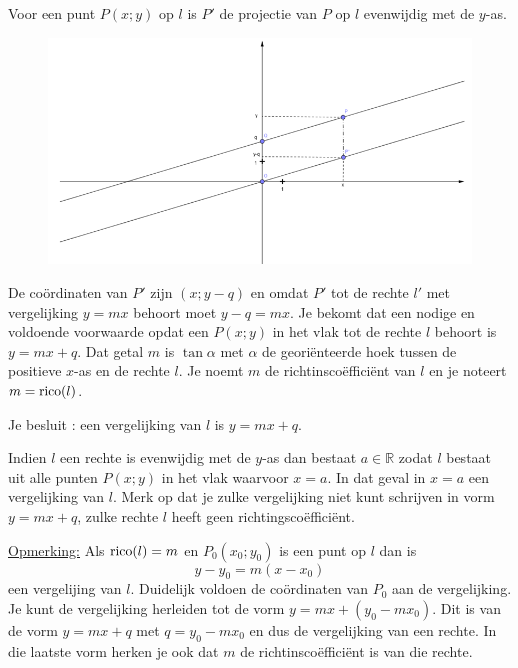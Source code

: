 Voor een punt $P(x;y)$ op $l$ is $P'$ de projectie van $P$ op $l$ evenwijdig met de $y$-as.
\begin{figure}[!htb]
\begin{center}
\includegraphics[height=8 cm]{4_opp_inhoud_an_meetk/inputs/AMtekst4Fig3}
\end{center}
\end{figure} 
De co\"ordinaten van $P'$ zijn $(x;y-q)$ en omdat $P'$ tot de rechte $l'$ met vergelijking $y=mx$ behoort moet $y-q=mx$.
Je bekomt dat een nodige en voldoende voorwaarde opdat een $P(x;y)$ in het vlak tot de rechte $l$ behoort is $y=mx+q$.
Dat getal $m$ is $\tan \alpha$ met $\alpha$ de geori\"enteerde hoek tussen de positieve $x$-as en de rechte $l$.
Je noemt $m$ de richtinsco\"effici\"ent van $l$ en je noteert $m=\operatorname{rico} (l)$.

Je besluit : een vergelijking van $l$ is $y=mx+q$.

Indien $l$ een rechte is evenwijdig met de $y$-as dan bestaat $a \in \mathbb{R}$ zodat $l$ bestaat uit alle punten $P(x;y)$ in het vlak waarvoor $x=a$.
In dat geval in $x=a$ een vergelijking van $l$.
Merk op dat je zulke vergelijking niet kunt schrijven in vorm $y=mx+q$, zulke rechte $l$ heeft geen richtingsco\"effici\"ent.

\noindent \underline{Opmerking:} Als $\operatorname{rico}(l)=m$ en $P_0(x_0;y_0)$ is een punt op $l$ dan is
\[
y-y_0=m(x-x_0)
\]
een vergelijing van $l$.
Duidelijk voldoen de co\"ordinaten van $P_0$ aan de vergelijking.
Je kunt de vergelijking herleiden tot de vorm $y=mx+(y_0-mx_0)$.
Dit is van de vorm $y=mx+q$ met $q=y_0-mx_0$ en dus de vergelijking van een rechte.
In die laatste vorm herken je ook dat $m$ de richtinsco\"effici\"ent is van die rechte.\\


